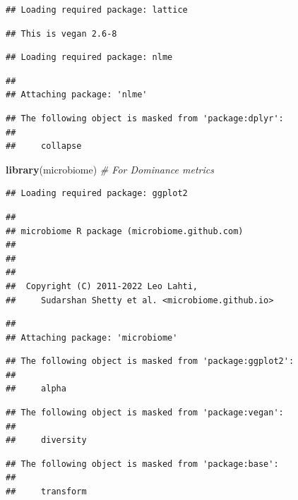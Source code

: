 \documentclass[
]{article}
\newenvironment{Shaded}{\begin{snugshade}}{\end{snugshade}}
\newcommand{\CommentTok}[1]{\textcolor[rgb]{0.56,0.35,0.01}{\textit{#1}}}
\newcommand{\FunctionTok}[1]{\textcolor[rgb]{0.13,0.29,0.53}{\textbf{#1}}}
\newcommand{\NormalTok}[1]{#1}
\begin{document}
\begin{verbatim}
## Loading required package: lattice
\end{verbatim}

\begin{verbatim}
## This is vegan 2.6-8
\end{verbatim}

\begin{verbatim}
## Loading required package: nlme
\end{verbatim}

\begin{verbatim}
## 
## Attaching package: 'nlme'
\end{verbatim}

\begin{verbatim}
## The following object is masked from 'package:dplyr':
## 
##     collapse
\end{verbatim}

\begin{Shaded}
\begin{Highlighting}[]
\FunctionTok{library}\NormalTok{(microbiome) }\CommentTok{\# For Dominance metrics}
\end{Highlighting}
\end{Shaded}

\begin{verbatim}
## Loading required package: ggplot2
\end{verbatim}

\begin{verbatim}
## 
## microbiome R package (microbiome.github.com)
##     
## 
## 
##  Copyright (C) 2011-2022 Leo Lahti, 
##     Sudarshan Shetty et al. <microbiome.github.io>
\end{verbatim}

\begin{verbatim}
## 
## Attaching package: 'microbiome'
\end{verbatim}

\begin{verbatim}
## The following object is masked from 'package:ggplot2':
## 
##     alpha
\end{verbatim}

\begin{verbatim}
## The following object is masked from 'package:vegan':
## 
##     diversity
\end{verbatim}

\begin{verbatim}
## The following object is masked from 'package:base':
## 
##     transform
\end{verbatim}
\end{document}
